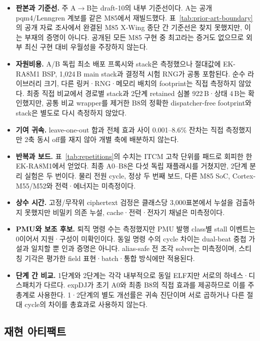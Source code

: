 \documentclass[runningheads,orivec]{llncs}
\begin{document}
\begin{itemize}[leftmargin=*,itemsep=1pt]
\item \textbf{판본과 기준선.} 주 A$\to$B는 draft-10의 내부 기준선이다. A는 공개
      pqm4/Lenngren 계보를 같은 M85에서 재빌드했다. 표~\ref{tab:prior-art-boundary}의
      공개 자료 조사에서 완결된 M85 X-Wing 종단 간 기준선은 찾지 못했지만, 이는 부재의
      증명이 아니다. 공개된 모든 M85 구현 중 최고라는 증거도 없으므로 외부 최신 구현
      대비 우월성을 주장하지 않는다.
\item \textbf{자원비용.} A/B 독립 최소 배포 프록시와 stack은 측정했으나 절대값에
      EK-RA8M1 BSP, 1,024\,B main stack과 결정적 시험 RNG가 공통 포함된다. 순수
      라이브러리 크기, 다른 링커·RNG·메모리 배치의 footprint는 직접 측정하지 않았다.
      최종 직접 비교에서 경로별 stack과 2단계 retained 심볼 922\,B·상태 4\,B는 확인했지만,
      공통 비교 wrapper를 제거한 B8의 정확한 dispatcher-free footprint와 stack은 별도로
      다시 측정하지 않았다.
\item \textbf{기여 귀속.} leave-one-out 합과 전체 효과 사이 0.001--8.6\% 잔차는 직접
      측정했지만 2축 동시 off를 재지 않아 개별 축에 배분하지 않는다.
\item \textbf{반복과 보드.} 표~\ref{tab:repetitions}의 수치는 ITCM 고착 단위를 패드로
      회피한 한 EK-RA8M1에서 얻었다. 최종 A0--B8은 다섯 독립 재플래시를 거쳤지만,
      2단계 분리 실험은 두 번이다. 물리 전원 cycle, 정상 두 번째 보드, 다른 M85 SoC,
      Cortex-M55/M52와 전력·에너지는 미측정이다.
\item \textbf{상수 시간.} 고정/무작위 ciphertext 검정은 클래스당 3,000표본에서
      누설을 검출하지 못했지만 비밀키 의존 누설, cache·전력·전자기 채널은 미측정이다.
\item \textbf{PMU와 보조 후보.} 퇴직 명령 수는 측정했지만 PMU 발행 class별 stall
      이벤트는 0이어서 지원·구성이 미확인이다. 동일 명령 수의 cycle 차이는 dual-beat
      중첩 가설과 일치할 뿐 인과 증명은 아니다. alias-safe 전 조각 solver는 미측정이며,
      스티칭 기각은 평가한 field 표현·batch·통합 방식에만 적용된다.
\item \textbf{단계 간 비교.} 1단계와 2단계는 각각 내부적으로 동일 ELF지만 서로의
      하네스·디스패치가 다르다. expDJ가 초기 A0와 최종 B8의 직접 효과를 제공하므로 이를
      주 총계로 사용한다. 1·2단계의 별도 개선률은 귀속 진단이며 서로 곱하거나 다른 절대
      cycle의 차이를 총효과로 사용하지 않는다.
\end{itemize}

\subsection{재현 아티팩트}
\end{document}
